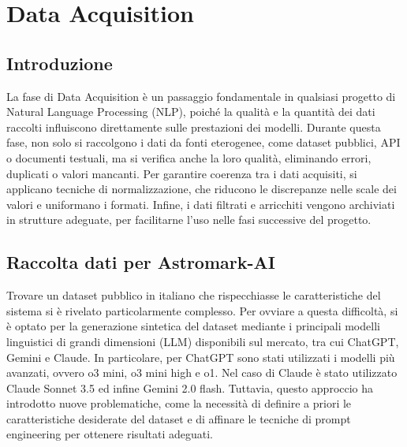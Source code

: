 \chapter{Data Acquisition}


\section{Introduzione}
La fase di Data Acquisition è un passaggio fondamentale in qualsiasi progetto di Natural Language Processing (NLP), poiché la qualità e la quantità dei dati raccolti influiscono direttamente sulle prestazioni dei modelli. Durante questa fase, non solo si raccolgono i dati da fonti eterogenee, come dataset pubblici, API o documenti testuali, ma si verifica anche la loro qualità, eliminando errori, duplicati o valori mancanti. Per garantire coerenza tra i dati acquisiti, si applicano tecniche di normalizzazione, che riducono le discrepanze nelle scale dei valori e uniformano i formati. Infine, i dati filtrati e arricchiti vengono archiviati in strutture adeguate, per facilitarne l’uso nelle fasi successive del progetto.

\section{Raccolta dati per Astromark-AI}
Trovare un dataset pubblico in italiano che rispecchiasse le caratteristiche del sistema si è rivelato particolarmente complesso. Per ovviare a questa difficoltà, si è optato per la generazione sintetica del dataset mediante i principali modelli linguistici di grandi dimensioni (LLM) disponibili sul mercato, tra cui ChatGPT, Gemini e Claude. In particolare, per ChatGPT sono stati utilizzati i modelli più avanzati, ovvero o3 mini, o3 mini high e o1. Nel caso di Claude è stato utilizzato Claude Sonnet 3.5 ed infine Gemini 2.0 flash. Tuttavia, questo approccio ha introdotto nuove problematiche, come la necessità di definire a priori le caratteristiche desiderate del dataset e di affinare le tecniche di prompt engineering per ottenere risultati adeguati.

